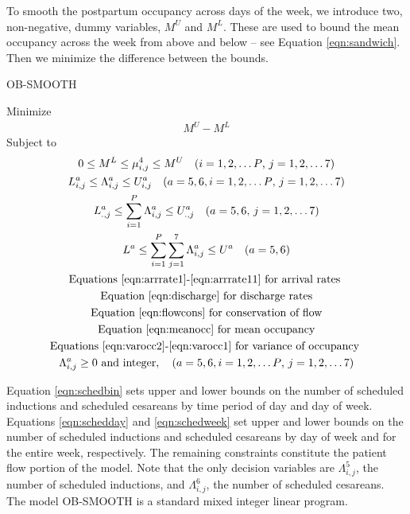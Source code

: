 \documentclass{article}
\newcommand{\nipar}{\par\noindent\ignorespaces}
\begin{document}
To smooth the postpartum occupancy across days of the week, we introduce two, non-negative, dummy variables, $M^{U}$ and $M^{L}$. These are used to bound the mean occupancy across the week from above and below -- see Equation \eqref{eqn:sandwich}. Then we minimize the difference between the bounds.

\newpage
\nipar {\bf Model:} OB-SMOOTH
\nipar
\nipar Minimize
\begin{gather}
M^{U} - M^{L} \label{eqn:obj} 
\end{gather}
Subject to
\begin{gather}
0 \leq M^{L} \leq \mu_{i,j}^{4} \leq M^{U} \quad \text{($i=1,2,\ldots P$, $j=1,2,\ldots 7$)} \label{eqn:sandwich} \\ 
L_{i,j}^{a} \leq \Lambda_{i,j}^{a} \leq U_{i,j}^{a} \quad \text{($a=5,6, i=1,2,\ldots P$, $j=1,2,\ldots 7$)} \label{eqn:schedbin} \\
L_{.,j}^{a} \leq \sum_{i=1}^{P}\Lambda_{i,j}^{a} \leq U_{.,j}^{a} \quad \text{($a=5,6$, $j=1,2,\ldots 7$)} \label{eqn:schedday} \\
L^{a} \leq \sum_{i=1}^{P}\sum_{j=1}^{7}\Lambda_{i,j}^{a} \leq U^{a} \quad \text{($a=5,6$)} \label{eqn:schedweek} \\ 
\text{Equations \eqref{eqn:arrrate1}-\eqref{eqn:arrrate11} for arrival rates }  \\
\text{Equation \eqref{eqn:discharge} for discharge rates}  \\
\text{Equation \eqref{eqn:flowcons} for conservation of flow}  \\
\text{Equation \eqref{eqn:meanocc} for mean occupancy} \\
\text{Equations \eqref{eqn:varocc2}-\eqref{eqn:varocc1} for variance of occupancy }  \\
\Lambda_{i,j}^{a} \geq 0 \text{ and integer}, \quad \text{($a=5,6, i=1,2,\ldots P$, $j=1,2,\ldots 7)$} \label{eqn:schedint}
\end{gather} 

Equation \eqref{eqn:schedbin} sets upper and lower bounds on the number of scheduled inductions and scheduled cesareans by time period of day and day of week. Equations \eqref{eqn:schedday} and \eqref{eqn:schedweek} set upper and lower bounds on the number of scheduled inductions and scheduled cesareans by day of week and for the entire week, respectively. The remaining constraints constitute the patient flow portion of the model. Note that the only decision variables are $\Lambda_{i,j}^{5}$, the number of scheduled inductions, and $\Lambda_{i,j}^{6}$, the number of scheduled cesareans. The model OB-SMOOTH is a standard mixed integer linear program. 
\end{document}
